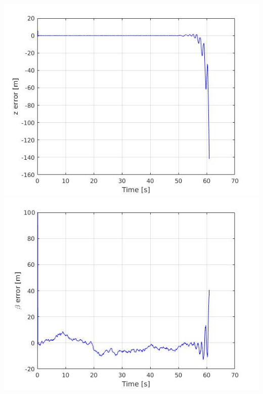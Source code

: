 \documentclass{beamer}
\begin{document}
\begin{frame}
\begin{columns}[t]
			\centering
			\includegraphics[scale=0.2]{z_div.jpg}\\
			\includegraphics[scale=0.2]{beta_div.jpg}
		\end{columns}
		
	\end{frame}
\end{document}

